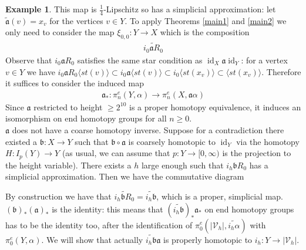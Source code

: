 \documentclass[a4paper,11pt]{article}
\theoremstyle{definition}
\newtheorem{example}[definition]{Example}
\theoremstyle{plain}
\theoremstyle{remark}
\DeclareMathOperator{\id}{id}
\begin{document}
{\begin{example}
This map is $\frac{1}{4}$-Lipschitz so has a simplicial approximation: let $\tilde{\mathfrak{a}}(v) = x_v$ for the vertices $v \in Y$. To apply Theorems \ref{main1} and \ref{main2} we only need to consider the map $\xi_{0,0}: Y\rightarrow X$ which is the composition 
\begin{align*}
\widetilde{i_{0}\mathfrak{a}R_{0}} 
\end{align*}
Observe that $i_{0}\mathfrak{a}R_{0}$ satisfies the same star condition as $\id_{X}\mathfrak{a} \id_{Y}$: for a vertex $v\in Y$ we have $i_{0}\mathfrak{a}R_{0} \langle st(v) \rangle \subset i_{0}\mathfrak{a} \langle st(v) \rangle \subset i_{0} \langle st(x_{v}) \rangle \subset \langle st(x_{v}) \rangle$. Therefore it suffices to consider the induced map 
\begin{align*}
\mathfrak{a}_{\ast}: \pi_{n}^{e}(Y,\alpha)\rightarrow \pi_{n}^{e}(X,\mathfrak{a}\alpha)
\end{align*}
Since $\mathfrak{a}$ restricted to height $\geq 2^{10}$ is a proper homotopy equivalence, it induces an isomorphism on end homotopy groups for all $n\geq 0$. \\

$\mathfrak{a}$ does not have a coarse homotopy inverse. Suppose for a contradiction there existed a $\mathfrak{b}: X\rightarrow Y$ such that $\mathfrak{b}\circ \mathfrak{a}$ is coarsely homotopic to $\id_{Y}$ via the homotopy $H: I_{p}(Y)\rightarrow Y$ (as usual, we can assume that $p: Y\rightarrow [0,\infty)$ is the projection to the height variable). There exists a $h$ large enough such that $i_{h}\mathfrak{b}R_{0}$ has a simplicial approximation. Then we have the commutative diagram 

\begin{figure}[H]
\center
{}
\end{figure}
 By construction we have that $\widetilde{i_{h}\mathfrak{b}R_{0}} = \widetilde{i_{h}\mathfrak{b}}$, which is a proper, simplicial map. $(\mathfrak{b})_{\ast} (\mathfrak{a})_{\ast}$ is the identity: this means that $(\widetilde{i_{h}\mathfrak{b}})_{\ast} \mathfrak{a}_{\ast}$ on end homotopy groups has to be the identity too, after the identification of $\pi^{e}_{0}(|\mathcal{V}_{h}|, \widetilde{i_{h}\alpha})$ with $ \pi_{0}^{e}(Y,\alpha)$. We will show that actually $\widetilde{i_{h}\mathfrak{b}}\mathfrak{a}$ is properly homotopic to $i_{h}: Y\rightarrow |\mathcal{V}_{h}|$. \\


\end{example}}
\end{document}
